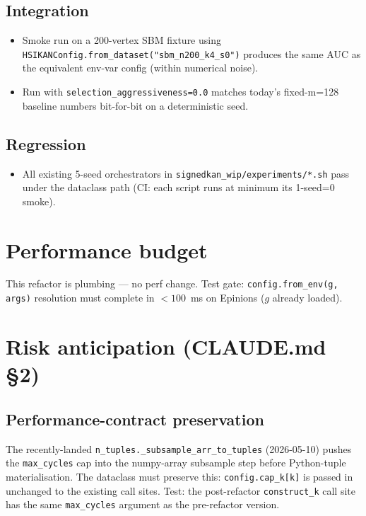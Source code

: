 \documentclass[11pt,a4paper]{article}
\begin{document}
\subsection*{Integration}
\begin{itemize}
\item Smoke run on a 200-vertex SBM fixture using
  \texttt{HSIKANConfig.from\_dataset("sbm\_n200\_k4\_s0")} produces
  the same AUC as the equivalent env-var config (within numerical
  noise).
\item Run with \texttt{selection\_aggressiveness=0.0} matches today's
  fixed-m=128 baseline numbers bit-for-bit on a deterministic seed.
\end{itemize}

\subsection*{Regression}
\begin{itemize}
\item All existing 5-seed orchestrators in
  \texttt{signedkan\_wip/experiments/*.sh} pass under the dataclass
  path (CI: each script runs at minimum its 1-seed=0 smoke).
\end{itemize}

\section{Performance budget}
This refactor is plumbing --- no perf change.  Test gate:
\texttt{config.from\_env(g, args)} resolution must complete in
$<100$~ms on Epinions ($g$ already loaded).

\section{Risk anticipation (CLAUDE.md \S2)}

\subsection*{Performance-contract preservation}
The recently-landed \texttt{n\_tuples.\_subsample\_arr\_to\_tuples}
(2026-05-10) pushes the \texttt{max\_cycles} cap into the numpy-array
subsample step before Python-tuple materialisation.  The dataclass
must preserve this: \texttt{config.cap\_k[k]} is passed in unchanged
to the existing call sites.  Test: the post-refactor
\texttt{construct\_k} call site has the same \texttt{max\_cycles}
argument as the pre-refactor version.
\end{document}
